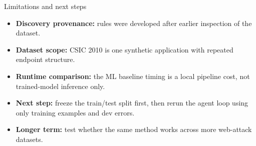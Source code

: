 \documentclass[aspectratio=169]{beamer}
\begin{document}
\begin{frame}{Limitations and next steps}
    \begin{itemize}
        \item<1-> \textbf{Discovery provenance:} rules were developed after earlier inspection of the dataset.
        \vspace{0.25cm}
        \item<2-> \textbf{Dataset scope:} CSIC 2010 is one synthetic application with repeated endpoint structure.
        \vspace{0.25cm}
        \item<3-> \textbf{Runtime comparison:} the ML baseline timing is a local pipeline cost, not trained-model inference only.
        \vspace{0.25cm}
        \item<4-> \textbf{Next step:} freeze the train/test split first, then rerun the agent loop using only training examples and dev errors.
        \vspace{0.25cm}
        \item<5-> \textbf{Longer term:} test whether the same method works across more web-attack datasets.
    \end{itemize}
\end{frame}
\end{document}
